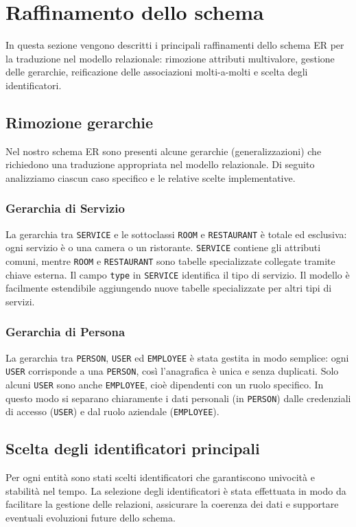 \documentclass[a4paper,12pt]{report}
\begin{document}
\newpage
\section{Raffinamento dello schema}
In questa sezione vengono descritti i principali raffinamenti dello
schema ER per la traduzione nel modello relazionale: rimozione
attributi multivalore, gestione delle gerarchie, reificazione delle
associazioni molti-a-molti e scelta degli identificatori.

\subsection{Rimozione gerarchie}
Nel nostro schema ER sono presenti alcune gerarchie
(generalizzazioni) che richiedono una traduzione appropriata nel
modello relazionale. Di seguito analizziamo ciascun caso specifico e
le relative scelte implementative.

\subsubsection{Gerarchia di Servizio}
La gerarchia tra \texttt{SERVICE} e le sottoclassi \texttt{ROOM} e
\texttt{RESTAURANT} è totale
ed esclusiva: ogni servizio è o una camera o un ristorante. \texttt{SERVICE}
contiene gli attributi comuni, mentre \texttt{ROOM} e
\texttt{RESTAURANT} sono tabelle
specializzate collegate tramite chiave esterna. Il campo
\texttt{type} in \texttt{SERVICE} identifica il tipo di servizio. Il modello è
facilmente estendibile aggiungendo nuove tabelle specializzate per
altri tipi di servizi.

\subsubsection{Gerarchia di Persona}
La gerarchia tra \texttt{PERSON}, \texttt{USER} ed \texttt{EMPLOYEE}
è stata gestita in modo semplice: ogni \texttt{USER} corrisponde a
una \texttt{PERSON}, così l'anagrafica è unica e senza duplicati.
Solo alcuni \texttt{USER} sono anche \texttt{EMPLOYEE}, cioè
dipendenti con un ruolo specifico. In questo modo si separano
chiaramente i dati personali (in \texttt{PERSON}) dalle credenziali
di accesso (\texttt{USER}) e dal ruolo aziendale (\texttt{EMPLOYEE}).

\subsection{Scelta degli identificatori principali}
Per ogni entità sono stati scelti identificatori che garantiscono
univocità e stabilità nel tempo. La selezione degli identificatori è
stata effettuata in modo da facilitare la gestione delle relazioni,
assicurare la coerenza dei dati e supportare eventuali evoluzioni
future dello schema.
\end{document}
